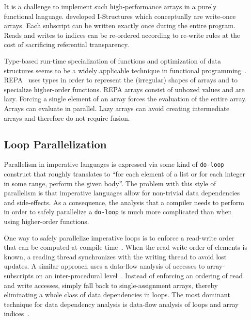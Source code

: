 \documentclass[a4paper]{article}
\begin{document}
It is a challenge to implement such high-performance arrays in a
purely functional language. \citet{Arvind:1989:IDS:69558.69562}
developed I-Structures which conceptually are write-once arrays. Each
subscript can be written exactly once during the entire program. Reads
and writes to indices can be re-ordered according to re-write rules at
the cost of sacrificing referential transparency.

Type-based run-time specialization of functions and optimization of
data structures seems to be a widely applicable technique in
functional
programming~\cite{Hall:1994:UHT:182409.156781}. REPA~\cite{Keller:2010:RSP:1863543.1863582}
uses types in order to represent the (irregular) shapes of arrays and
to specialize higher-order functions. REPA arrays consist of unboxed
values and are lazy. Forcing a single element of an array forces the
evaluation of the entire array. Arrays can evaluate in parallel. Lazy
arrays can avoid creating intermediate arrays and therefore do not
require fusion.

\subsection{Loop Parallelization}
\label{sec:loop-parallelization}

Parallelism in imperative languages is expressed via some kind of
\texttt{do-loop} construct that roughly translates to ``for each
element of a list or for each integer in some range, perform the given
body''. The problem with this style of parallelism is that imperative
languages allow for non-trivial data dependencies and side-effects. As
a consequence, the analysis that a compiler needs to perform in order
to safely parallelize a \texttt{do-loop} is much more complicated than
when using higher-order functions.

One way to safely parallelize imperative loops is to enforce a
read-write order that can be computed at compile
time~\cite{Tang:1990:CTD:77726.255155}. When the read-write order of
elements is known, a reading thread synchronizes with the writing
thread to avoid lost updates. A similar approach uses a data-flow
analysis of accesses to array-subscripts on an inter-procedural
level~\cite{Maydan:1993:AFA:158511.158515}. Instead of enforcing an
ordering of read and write accesses,
\citet{Knobe:1998:ASF:268946.268956} simply fall back to
single-assignment arrays, thereby eliminating a whole class of data
dependencies in loops. The most dominant technique for data dependency
analysis is data-flow analysis of loops and array
indices~\cite{Maydan:1993:AFA:158511.158515,
  Knobe:1998:ASF:268946.268956}.
\end{document}
